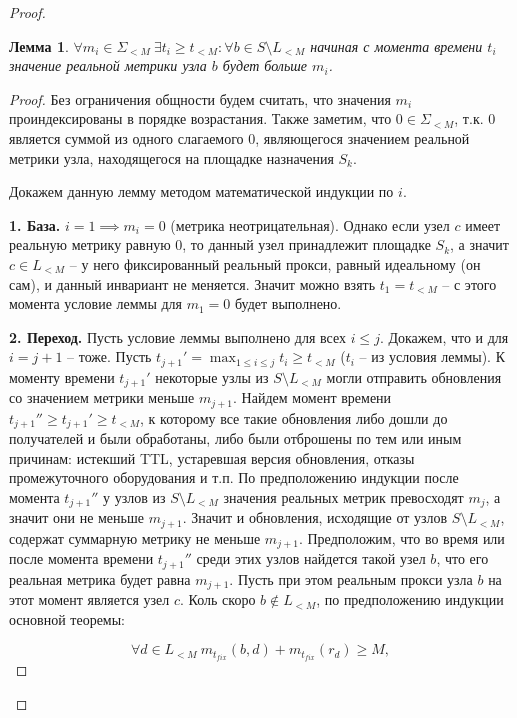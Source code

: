 \documentclass{article}
\theoremstyle{plain}
\theoremstyle{plain}
\theoremstyle{plain}
\newtheorem{lemma}{Лемма}[section]
\theoremstyle{plain}
\theoremstyle{definition}
\theoremstyle{remark}
\theoremstyle{plain}
\begin{document}
\begin{proof}
    \begin{lemma}
    \label{DecayLemma}
        $\forall m_i \in \Sigma_{< M}\ \exists t_i \geq t_{< M} : \forall b \in S \setminus L_{< M}$ начиная с момента времени $t_i$ значение реальной метрики узла $b$ будет больше $m_i$.
    \end{lemma}
    \begin{proof}
        Без ограничения общности будем считать, что значения $m_i$ проиндексированы в порядке возрастания. Также заметим, что $0 \in \Sigma_{< M}$, т.к. $0$ является суммой из одного слагаемого $0$, являющегося значением реальной метрики узла, находящегося на площадке назначения $S_k$.
        
        Докажем данную лемму методом математической индукции по $i$.
        
        \textbf{1. База.} $i = 1 \implies m_i = 0$ (метрика неотрицательная). Однако если узел $c$ имеет реальную метрику равную $0$, то данный узел принадлежит площадке $S_k$, а значит $c \in L_{< M}$ -- у него фиксированный реальный прокси, равный идеальному (он сам), и данный инвариант не меняется. Значит можно взять $t_1 = t_{< M}$ -- с этого момента условие леммы для $m_1 = 0$ будет выполнено.
        
        \textbf{2. Переход.} Пусть условие леммы выполнено для всех $i \leq j$. Докажем, что и для $i = j + 1$ -- тоже. Пусть $t_{j + 1}' = \displaystyle \max_{1 \leq i \leq j} t_i \geq t_{< M}$ ($t_i$ -- из условия леммы). К моменту времени $t_{j + 1}'$ некоторые узлы из $S \setminus L_{< M}$ могли отправить обновления со значением метрики меньше $m_{j + 1}$. Найдем момент времени $t_{j + 1}'' \geq t_{j + 1}' \geq t_{< M}$, к которому все такие обновления либо дошли до получателей и были обработаны, либо были отброшены по тем или иным причинам: истекший TTL, устаревшая версия обновления, отказы промежуточного оборудования и т.п. По предположению индукции после момента $t_{j + 1}''$ у узлов из $S \setminus L_{< M}$ значения реальных метрик превосходят $m_j$, а значит они не меньше $m_{j + 1}$. Значит и обновления, исходящие от узлов $S \setminus L_{< M}$, содержат суммарную метрику не меньше $m_{j + 1}$. Предположим, что во время или после момента времени $t_{j + 1}''$ среди этих узлов найдется такой узел $b$, что его реальная метрика будет равна $m_{j + 1}$. Пусть при этом реальным прокси узла $b$ на этот момент является узел $c$. Коль скоро $b \notin L_{< M}$, по предположению индукции основной теоремы:
        
        \begin{equation}
        \label{CantImproveByStable}
            \forall d \in L_{< M}\ m_{t_{fix}}(b, d) + m_{t_{fix}}(r_d) \geq M,
        \end{equation}
        

\end{proof}
\end{proof}
\end{document}
